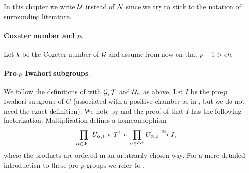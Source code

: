 \begin{remark}
  In this chapter we write $\mathcal{U}$ instead of $\mathcal{N}$ since we try to stick to the notation of surrounding literature.
\end{remark}

\paragraph{Coxeter number and $p$.} Let $h$ be the Coxeter number of $\mathcal{G}$ and assume from now on that $p-1 > eh$.


\paragraph{Pro-$p$ Iwahori subgroups.} We follow the definitions of \cite{SchOll-modular} with $\mathcal{G}, \mathcal{T}$ and $\mathcal{U}_{\alpha}$ as above. Let $I$ be the pro-$p$ Iwahori subgroup of $G$ (associated with a positive chamber as in \cite{SchOll-modular}, but we do not need the exact definition). We note by \cite[Lem.~2.1(i)]{SchOll-modular} and the proof of \cite[Lem.~2.3]{SchOll-modular} that $I$ has the following factorization: Multiplication defines a homeomorphism
\begin{equation}\label{eq:Iwahori-factor}
  \prod_{\alpha \in \Phi^{-}} U_{\alpha,1} \times T^{1} \times \prod_{\alpha \in \Phi^{+}} U_{\alpha,0} \xrightarrow{\cong} I,
\end{equation}
where the products are ordered in an arbitrarily chosen way. For a more detailed introduction to these pro-$p$ groups we refer to \cite{SchOll-modular}.

